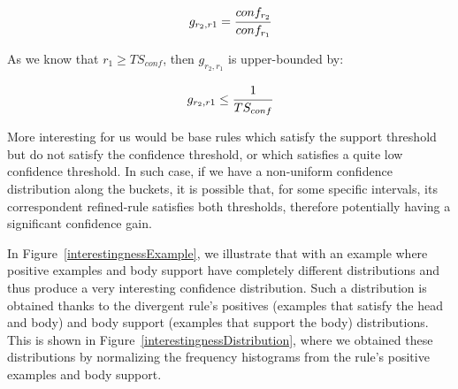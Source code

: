 \begin{equation}
 g_{r_2,r1}=\cfrac{conf_{r_2}}{conf_{r_1}}
\end{equation}

As we know that $r_1 \geq TS_{conf}$, then $g_{r_2,r_1}$ is upper-bounded by:

\begin{equation}
 g_{r_2,r1} \leq \cfrac{1}{TS_{conf}}
\end{equation}

More interesting for us would be base rules which satisfy the support threshold but do not satisfy the confidence
threshold, or which satisfies a quite low confidence threshold. In such case, if we have a non-uniform confidence
distribution along the buckets, it is possible that, for some specific intervals, its correspondent refined-rule
satisfies both thresholds, therefore potentially having a significant confidence gain.

In Figure~\ref{interestingnessExample}, we illustrate that with an example where positive examples and body
support have completely different distributions and thus produce a very interesting confidence distribution. Such a
distribution is obtained thanks to the divergent rule's positives (examples that satisfy the head and body) and body
support (examples that support the body) distributions. This is shown in Figure~\ref{interestingnessDistribution},
where we obtained these distributions by normalizing the frequency histograms
from the rule's positive examples and body support.


